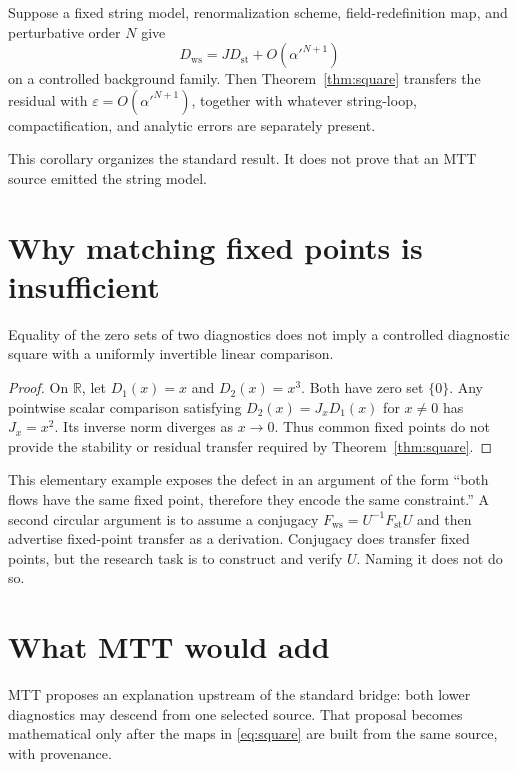 \documentclass[11pt]{article}
\newcommand{\alphap}{\alpha'}
\begin{document}
\begin{corollary}
Suppose a fixed string model, renormalization scheme, field-redefinition
map, and perturbative order \(N\) give
\[
D_{\mathrm{ws}}=J D_{\mathrm{st}}+O(\alphap^{N+1})
\]
on a controlled background family.  Then Theorem~\ref{thm:square} transfers
the residual with \(\varepsilon=O(\alphap^{N+1})\), together with whatever
string-loop, compactification, and analytic errors are separately present.
\end{corollary}

This corollary organizes the standard result.  It does not prove that an MTT
source emitted the string model.

\section{Why matching fixed points is insufficient}

\begin{proposition}
\label{prop:no-go}
Equality of the zero sets of two diagnostics does not imply a controlled
diagnostic square with a uniformly invertible linear comparison.
\end{proposition}

\begin{proof}
On \(\mathbb{R}\), let \(D_1(x)=x\) and \(D_2(x)=x^3\).  Both have zero set
\(\{0\}\).  Any pointwise scalar comparison satisfying
\(D_2(x)=J_xD_1(x)\) for \(x\neq0\) has \(J_x=x^2\).  Its inverse norm
diverges as \(x\to0\).  Thus common fixed points do not provide the stability
or residual transfer required by Theorem~\ref{thm:square}.
\end{proof}

This elementary example exposes the defect in an argument of the form
``both flows have the same fixed point, therefore they encode the same
constraint.''  A second circular argument is to assume a conjugacy
\(F_{\mathrm{ws}}=U^{-1}F_{\mathrm{st}}U\) and then advertise fixed-point
transfer as a derivation.  Conjugacy does transfer fixed points, but the
research task is to construct and verify \(U\).  Naming it does not do so.

\section{What MTT would add}

MTT proposes an explanation upstream of the standard bridge: both lower
diagnostics may descend from one selected source.  That proposal becomes
mathematical only after the maps in \eqref{eq:square} are built from the same
source, with provenance.
\end{document}
